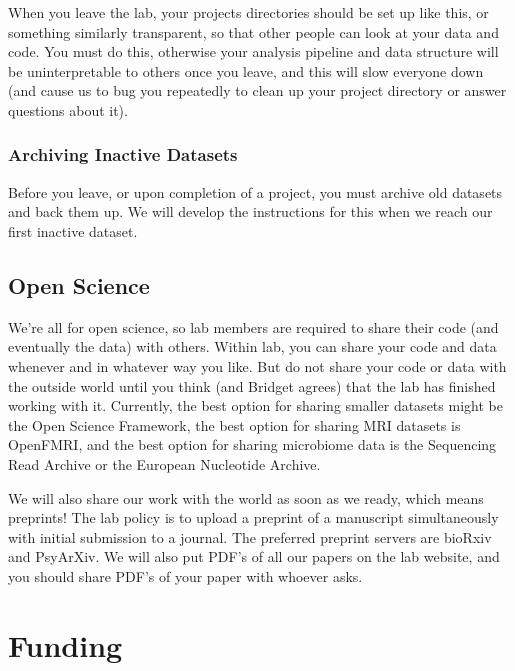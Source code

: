 \documentclass[]{book}
\begin{document}
When you leave the lab, your projects directories should be set up like this, or something similarly transparent, so that other people can look at your data and code. You must do this, otherwise your analysis pipeline and data structure will be uninterpretable to others once you leave, and this will slow everyone down (and cause us to bug you repeatedly to clean up your project directory or answer questions about it).

\hypertarget{archiving-inactive-datasets}{%
\subsection{Archiving Inactive Datasets}\label{archiving-inactive-datasets}}

Before you leave, or upon completion of a project, you must archive old datasets and back them up. We will develop the instructions for this when we reach our first inactive dataset.

\hypertarget{open-science}{%
\section{Open Science}\label{open-science}}

We're all for open science, so lab members are required to share their code (and eventually the data) with others. Within lab, you can share your code and data whenever and in whatever way you like. But do not share your code or data with the outside world until you think (and Bridget agrees) that the lab has finished working with it. Currently, the best option for sharing smaller datasets might be the Open Science Framework, the best option for sharing MRI datasets is OpenFMRI, and the best option for sharing microbiome data is the Sequencing Read Archive or the European Nucleotide Archive.

We will also share our work with the world as soon as we ready, which means preprints! The lab policy is to upload a preprint of a manuscript simultaneously with initial submission to a journal. The preferred preprint servers are bioRxiv and PsyArXiv. We will also put PDF's of all our papers on the lab website, and you should share PDF's of your paper with whoever asks.

\hypertarget{funding}{%
\chapter{Funding}\label{funding}}
\end{document}
